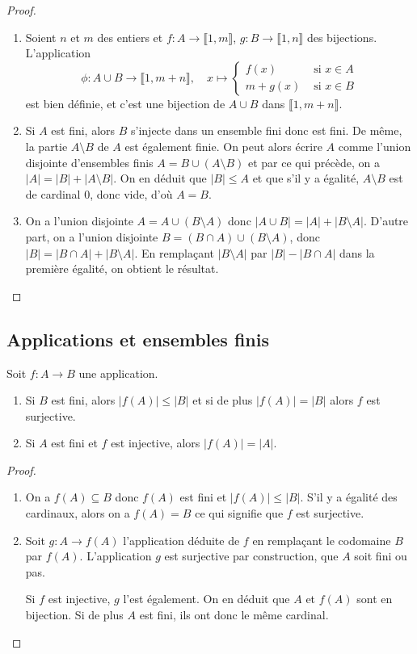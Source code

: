 \begin{proof}
\begin{enumerate}
\item Soient $n$ et $m$ des entiers et $f : A\to \llbracket 1,m\rrbracket$, $g : B\to \llbracket 1,n\rrbracket$ des bijections. L'application 
\[
\phi : A\cup B \to \llbracket 1,m+n\rrbracket, \quad x\mapsto
\begin{cases}
f(x) & \text{ si }x\in A\\
m+g(x) & \text{ si }x\in B
\end{cases}
\]
est bien définie, et c'est une bijection de $A\cup B$ dans $\llbracket 1,m+n\rrbracket$.
\item Si $A$ est fini, alors $B$ s'injecte dans un ensemble fini donc est fini. De même, la partie $A\setminus B$ de $A$ est également finie. On peut alors écrire $A$ comme l'union disjointe d'ensembles finis $A=B \cup (A\setminus B)$ et par ce qui précède, on a $|A|=|B|+|A\setminus B|$. On en déduit que $|B|\leq A$ et que s'il y a égalité, $A\setminus B$ est de cardinal $0$, donc vide, d'où $A=B$.
\item On a l'union disjointe $A = A\cup (B\setminus A)$  donc $|A\cup B| = |A|+|B\setminus A|$.
D'autre part, on a l'union disjointe $B = (B\cap A) \cup (B\setminus A)$, donc $|B| = |B\cap A|+|B\setminus A|$.
En remplaçant $|B\setminus A|$ par $|B|-|B\cap A|$ dans la première égalité, on obtient le résultat.
\end{enumerate}
\end{proof}

\subsection{Applications et ensembles finis}

\begin{proposition}
Soit $f : A\to B$ une application.
\begin{enumerate}
\item Si $B$ est fini, alors $|f(A)|\leq |B|$ et si de plus $|f(A)|= |B|$ alors $f$ est surjective.
\item Si $A$ est fini et $f$ est injective, alors $|f(A)|=|A|$.
\end{enumerate}
\end{proposition}
\begin{proof}
\begin{enumerate}
\item On a $f(A)\subseteq B$ donc $f(A)$ est fini et $|f(A)|\leq |B|$. S'il y a égalité des cardinaux, alors on a $f(A)=B$ ce qui signifie que $f$ est surjective.
\item Soit $g : A\to f(A)$ l'application déduite de $f$ en remplaçant le codomaine $B$ par $f(A)$. L'application $g$ est surjective par construction, que $A$ soit fini ou pas.

Si $f$ est injective, $g$ l'est également. On en déduit que $A$ et $f(A)$ sont en bijection. Si de plus $A$ est fini, ils ont donc le même cardinal.
\end{enumerate}
\end{proof}

